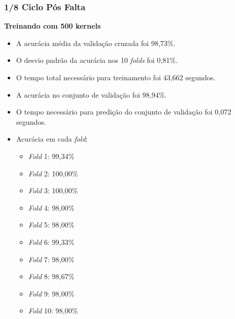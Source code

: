 \subsubsection{1/8 Ciclo Pós Falta}
\textbf{Treinando com 500 kernels}
\begin{itemize}
    \item A acurácia média da validação cruzada foi 98,73\%.
    \item O desvio padrão da acurácia nos 10 \textit{folds} foi 0,81\%.
    \item O tempo total necessário para treinamento foi 43,662 segundos.
    \item A acurácia no conjunto de validação foi 98,94\%.
    \item O tempo necessário para predição do conjunto de validação foi 0,072 segundos.
    \item Acurácia em cada \textit{fold}:
    \begin{itemize}
        \item \textit{Fold} 1: 99,34\%
        \item \textit{Fold} 2: 100,00\%
        \item \textit{Fold} 3: 100,00\%
        \item \textit{Fold} 4: 98,00\%
        \item \textit{Fold} 5: 98,00\%
        \item \textit{Fold} 6: 99,33\%
        \item \textit{Fold} 7: 98,00\%
        \item \textit{Fold} 8: 98,67\%
        \item \textit{Fold} 9: 98,00\%
        \item \textit{Fold} 10: 98,00\%
    \end{itemize}
\end{itemize}

